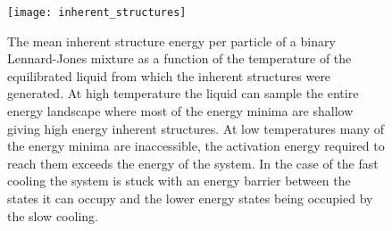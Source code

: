 \begin{figure}
    \begin{centering}
    \texttt{[image: inherent\_structures]}
    \caption{The mean inherent structure energy per particle of a binary Lennard-Jones mixture as a function of the temperature of the equilibrated liquid from which the inherent structures were generated. At high temperature the liquid can sample the entire energy landscape where most of the energy minima are shallow giving high energy inherent structures. At low temperatures many of the energy minima are inaccessible, the activation energy required to reach them exceeds the energy of the system. In the case of the fast cooling the system is stuck with an energy barrier between the states it can occupy and the lower energy states being occupied by the slow cooling.}
    \label{fig:inherent structures}
\end{centering}
\end{figure}

